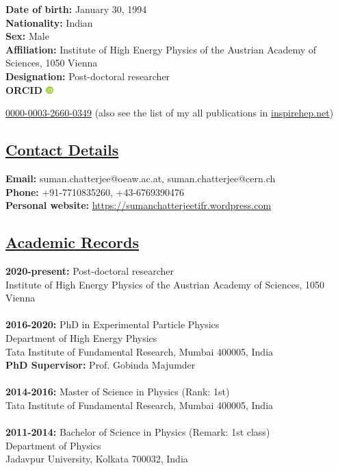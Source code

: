 \documentclass[a4paper,11pt]{article}
\newcommand{\orcid}[1]{\href{https://orcid.org/#1}{\includegraphics[width=8pt]{Figures/ORCIDiD_icon16x16.png}}}
\begin{document}
\textbf{Date of birth:} January 30, 1994\\
\textbf{Nationality:} Indian \\
\textbf{Sex:} Male \\
\textbf{Affiliation:} Institute of High Energy Physics of the Austrian Academy of Sciences, 1050 Vienna \\
\textbf{Designation:} Post-doctoral researcher \\
\textbf{ORCID \orcid:} {\href{https://orcid.org/0000-0003-2660-0349}{0000-0003-2660-0349} (also see the list of my all publications in {\href{https://inspirehep.net/authors/1471776}{inspirehep.net}})

\subsection*{\underline{Contact Details}}

\textbf{Email:} suman.chatterjee@oeaw.ac.at, suman.chatterjee@cern.ch\\
\textbf{Phone: } +91-7710835260, +43-6769390476\\
\textbf{Personal website: } \href{https://sumanchatterjeetifr.wordpress.com}{https://sumanchatterjeetifr.wordpress.com}

\subsection*{\underline{Academic Records}}

\textbf{2020-present:}
Post-doctoral researcher\\
Institute of High Energy Physics of the Austrian Academy of Sciences, 1050 Vienna\\
\\
\textbf{2016-2020:}
PhD in Experimental Particle Physics\\
Department of High Energy Physics\\
Tata Institute of Fundamental Research, Mumbai 400005, India\\
\textbf{PhD Supervisor:} Prof. Gobinda Majumder\\
\\
\textbf{2014-2016:}
Master of Science in Physics (Rank: 1st)\\
Tata Institute of Fundamental Research, Mumbai 400005, India\\
\\
\textbf{2011-2014:}
Bachelor of Science in Physics (Remark: 1st class)\\
Department of Physics\\
Jadavpur University, Kolkata  700032, India

}
\end{document}
